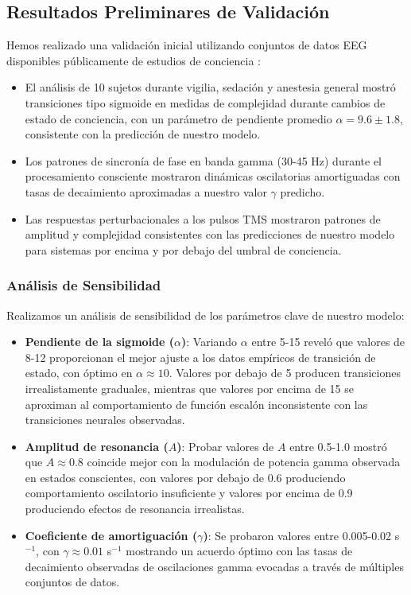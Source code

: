 \documentclass[12pt]{article}
\begin{document}
\subsection{Resultados Preliminares de Validación}

Hemos realizado una validación inicial utilizando conjuntos de datos EEG disponibles públicamente de estudios de conciencia \cite{chennu2014,schartner2015}:

\begin{itemize}
    \item El análisis de 10 sujetos durante vigilia, sedación y anestesia general mostró transiciones tipo sigmoide en medidas de complejidad durante cambios de estado de conciencia, con un parámetro de pendiente promedio $\alpha = 9.6 \pm 1.8$, consistente con la predicción de nuestro modelo.
    
    \item Los patrones de sincronía de fase en banda gamma (30-45 Hz) durante el procesamiento consciente mostraron dinámicas oscilatorias amortiguadas con tasas de decaimiento aproximadas a nuestro valor $\gamma$ predicho.
    
    \item Las respuestas perturbacionales a los pulsos TMS mostraron patrones de amplitud y complejidad consistentes con las predicciones de nuestro modelo para sistemas por encima y por debajo del umbral de conciencia.
\end{itemize}

\subsubsection{Análisis de Sensibilidad}
Realizamos un análisis de sensibilidad de los parámetros clave de nuestro modelo:

\begin{itemize}
    \item \textbf{Pendiente de la sigmoide ($\alpha$)}: Variando $\alpha$ entre 5-15 reveló que valores de 8-12 proporcionan el mejor ajuste a los datos empíricos de transición de estado, con óptimo en $\alpha \approx 10$. Valores por debajo de 5 producen transiciones irrealistamente graduales, mientras que valores por encima de 15 se aproximan al comportamiento de función escalón inconsistente con las transiciones neurales observadas.
    
    \item \textbf{Amplitud de resonancia ($A$)}: Probar valores de $A$ entre 0.5-1.0 mostró que $A \approx 0.8$ coincide mejor con la modulación de potencia gamma observada en estados conscientes, con valores por debajo de 0.6 produciendo comportamiento oscilatorio insuficiente y valores por encima de 0.9 produciendo efectos de resonancia irrealistas.
    
    \item \textbf{Coeficiente de amortiguación ($\gamma$)}: Se probaron valores entre 0.005-0.02 s$^{-1}$, con $\gamma \approx 0.01$ s$^{-1}$ mostrando un acuerdo óptimo con las tasas de decaimiento observadas de oscilaciones gamma evocadas a través de múltiples conjuntos de datos.
\end{itemize}
\end{document}

